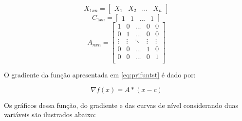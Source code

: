\begin{equation*}
    X_{1xn} = \begin{bmatrix}
                    X_1 & X_2 & \ldots & X_n
                \end{bmatrix}    
\end{equation*}
\begin{equation*}
    C_{1xn} = \begin{bmatrix}
                    1 & 1 & \ldots & 1
                \end{bmatrix}    
\end{equation*}
\begin{equation*}
    A_{nxn} = \begin{bmatrix}
                    1 & 0 & \ldots & 0 & 0 \\
                    0 & 1 & \ldots & 0 & 0 \\
                    \vdots & \vdots & \ddots & \vdots & \vdots \\
                    0 & 0 & \ldots & 1 & 0 \\
                    0 & 0 & \ldots & 0 & 1 \\
                \end{bmatrix}    
\end{equation*}

O gradiente da função apresentada em \ref{eq:prifuntst} é dado por:

\begin{equation}\label{eq:gradprifuntst}
    \nabla f(x) = A*(x-c)
\end{equation}

Os gráficos dessa função, do gradiente e das curvas de nível considerando duas variáveis são ilustrados abaixo:

